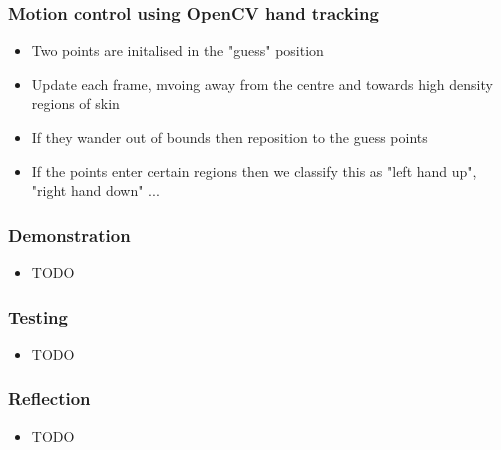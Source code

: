 \documentclass{beamer}
\begin{document}
\begin{frame}
\frametitle{Motion control using OpenCV {hand tracking}}
\begin{itemize}
	\item Two points are initalised in the "guess" position
	\item Update each frame, mvoing away from the centre and towards high density regions of skin
	\item If they wander out of bounds then reposition to the guess points
	\item If the points enter certain regions then we classify this as "left hand up", "right hand down" ...
\end{itemize}
\end{frame}

\begin{frame}
\frametitle{Demonstration}
\begin{itemize}
	\item TODO
\end{itemize}
\end{frame}

\begin{frame}
\frametitle{Testing}
\begin{itemize}
	\item TODO
\end{itemize}
\end{frame}

\begin{frame}
\frametitle{Reflection}
\begin{itemize}
	\item TODO
\end{itemize}
\end{frame}
\end{document}
